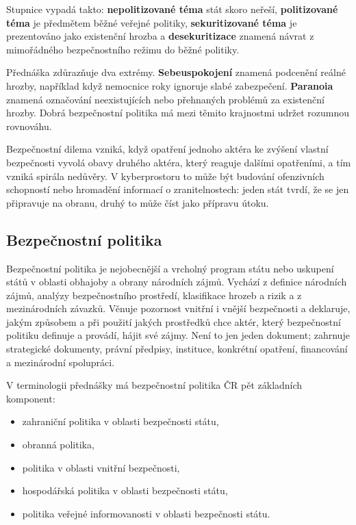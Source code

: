 Stupnice vypadá takto: \textbf{nepolitizované téma} stát skoro neřeší, \textbf{politizované téma} je předmětem běžné veřejné politiky, \textbf{sekuritizované téma} je prezentováno jako existenční hrozba a \textbf{desekuritizace} znamená návrat z mimořádného bezpečnostního režimu do běžné politiky.

Přednáška zdůrazňuje dva extrémy. \textbf{Sebeuspokojení} znamená podcenění reálné hrozby, například když nemocnice roky ignoruje slabé zabezpečení. \textbf{Paranoia} znamená označování neexistujících nebo přehnaných problémů za existenční hrozby. Dobrá bezpečnostní politika má mezi těmito krajnostmi udržet rozumnou rovnováhu.

Bezpečnostní dilema vzniká, když opatření jednoho aktéra ke zvýšení vlastní bezpečnosti vyvolá obavy druhého aktéra, který reaguje dalšími opatřeními, a tím vzniká spirála nedůvěry. V kyberprostoru to může být budování ofenzivních schopností nebo hromadění informací o zranitelnostech: jeden stát tvrdí, že se jen připravuje na obranu, druhý to může číst jako přípravu útoku.

\subsection*{Bezpečnostní politika}
Bezpečnostní politika je nejobecnější a vrcholný program státu nebo uskupení států v oblasti obhajoby a obrany národních zájmů. Vychází z definice národních zájmů, analýzy bezpečnostního prostředí, klasifikace hrozeb a rizik a z mezinárodních závazků. Věnuje pozornost vnitřní i vnější bezpečnosti a deklaruje, jakým způsobem a při použití jakých prostředků chce aktér, který bezpečnostní politiku definuje a provádí, hájit své zájmy. Není to jen jeden dokument; zahrnuje strategické dokumenty, právní předpisy, instituce, konkrétní opatření, financování a mezinárodní spolupráci.

V terminologii přednášky má bezpečnostní politika ČR pět základních komponent:
\begin{itemize}
  \item zahraniční politika v oblasti bezpečnosti státu,
  \item obranná politika,
  \item politika v oblasti vnitřní bezpečnosti,
  \item hospodářská politika v oblasti bezpečnosti státu,
  \item politika veřejné informovanosti v oblasti bezpečnosti státu.
\end{itemize}

